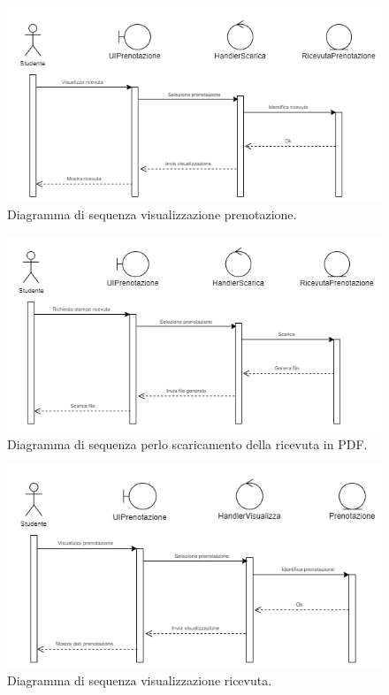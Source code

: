 \begin{figure}[H]
\begin{center}
  \includegraphics[width=1 \textwidth]{Figure/sequence visualizza.png}
    \caption{Diagramma di sequenza visualizzazione prenotazione.}\label{figura: visualizza}
\end{center}
\end{figure}


\begin{figure}[H]
\begin{center}
  \includegraphics[width=1 \textwidth]{Figure/sequence scarica.png}
    \caption{Diagramma di sequenza perlo scaricamento della ricevuta in PDF.}\label{figura: scarica}
\end{center}
\end{figure}


\begin{figure}[H]
\begin{center}
  \includegraphics[width=1 \textwidth]{Figure/sequence visualizza ricevuta.png}
    \caption{Diagramma di sequenza visualizzazione ricevuta.}\label{figura: visualizza ricevuta}
\end{center}
\end{figure}



